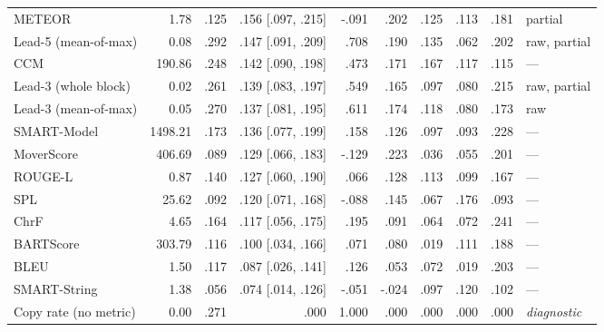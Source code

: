 \begin{table}[t]
\begin{tabular}{@{}lrrrrrrrrl@{}}
METEOR & 1.78 & .125 & .156 {\scriptsize [.097, .215]} & -.091 & .202 & .125 & .113 & .181 & partial \\
Lead-5 (mean-of-max) & 0.08 & .292 & .147 {\scriptsize [.091, .209]} & .708 & .190 & .135 & .062 & .202 & raw, partial \\
CCM & 190.86 & .248 & .142 {\scriptsize [.090, .198]} & .473 & .171 & .167 & .117 & .115 & --- \\
Lead-3 (whole block) & 0.02 & .261 & .139 {\scriptsize [.083, .197]} & .549 & .165 & .097 & .080 & .215 & raw, partial \\
Lead-3 (mean-of-max) & 0.05 & .270 & .137 {\scriptsize [.081, .195]} & .611 & .174 & .118 & .080 & .173 & raw \\
SMART-Model & 1498.21 & .173 & .136 {\scriptsize [.077, .199]} & .158 & .126 & .097 & .093 & .228 & --- \\
MoverScore & 406.69 & .089 & .129 {\scriptsize [.066, .183]} & -.129 & .223 & .036 & .055 & .201 & --- \\
ROUGE-L & 0.87 & .140 & .127 {\scriptsize [.060, .190]} & .066 & .128 & .113 & .099 & .167 & --- \\
SPL & 25.62 & .092 & .120 {\scriptsize [.071, .168]} & -.088 & .145 & .067 & .176 & .093 & --- \\
ChrF & 4.65 & .164 & .117 {\scriptsize [.056, .175]} & .195 & .091 & .064 & .072 & .241 & --- \\
BARTScore & 303.79 & .116 & .100 {\scriptsize [.034, .166]} & .071 & .080 & .019 & .111 & .188 & --- \\
BLEU & 1.50 & .117 & .087 {\scriptsize [.026, .141]} & .126 & .053 & .072 & .019 & .203 & --- \\
SMART-String & 1.38 & .056 & .074 {\scriptsize [.014, .126]} & -.051 & -.024 & .097 & .120 & .102 & --- \\
\midrule
Copy rate (no metric) & 0.00 & .271 & .000 & 1.000 & .000 & .000 & .000 & .000 & \emph{diagnostic} \\
\bottomrule
\end{tabular}
\end{table}
